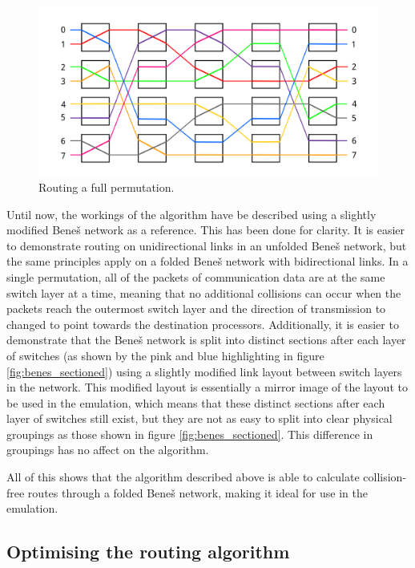 \documentclass[a4paper, 12pt]{article}
\begin{document}
\begin{figure}[H]
\centering
\includegraphics[width=\textwidth]{benes_full_perm.png}
\caption[Routing a full permutation]{Routing a full permutation.}
\label{fig:benes_full_perm}
\end{figure}

Until now, the workings of the algorithm have be described using a slightly modified Bene\v{s} network as a reference. This has been done for clarity. It is easier to demonstrate routing on unidirectional links in an unfolded Bene\v{s} network, but the same principles apply on a folded Bene\v{s} network with bidirectional links. In a single permutation, all of the packets of communication data are at the same switch layer at a time, meaning that no additional collisions can occur when the packets reach the outermost switch layer and the direction of transmission to changed to point towards the destination processors. Additionally, it is easier to demonstrate that the Bene\v{s} network is split into distinct sections after each layer of switches (as shown by the pink and blue highlighting in figure \ref{fig:benes_sectioned}) using a slightly modified link layout between switch layers in the network. This modified layout is essentially a mirror image of the layout to be used in the emulation, which means that these distinct sections after each layer of switches still exist, but they are not as easy to split into clear physical groupings as those shown in figure \ref{fig:benes_sectioned}. This difference in groupings has no affect on the algorithm.

All of this shows that the algorithm described above is able to calculate collision-free routes through a folded Bene\v{s} network, making it ideal for use in the emulation.

\subsection{Optimising the routing algorithm}
\end{document}
